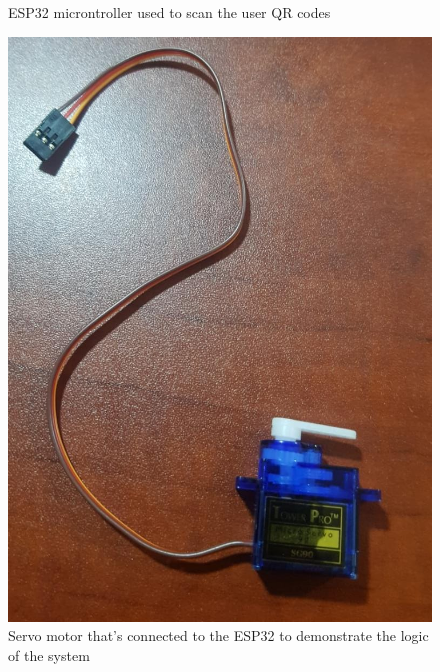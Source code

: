 \begin{figure}[h]
    \caption{ESP32 microntroller used to scan the user QR codes}%
    \label{fig:equip}%
\end{figure}


\begin{figure}[h]
    \begin{center}
        \includegraphics[scale = 0.2]{images/servo}
        \caption{Servo motor that's connected to the ESP32 to demonstrate the logic of the system}
    \end{center}
\end{figure}

\clearpage

